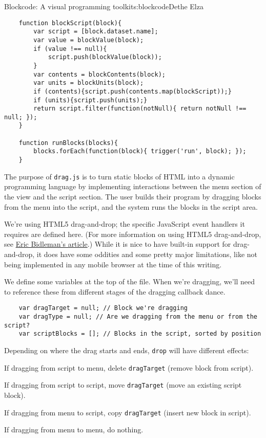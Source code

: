 \begin{aosachapter}{Blockcode: A visual programming toolkit}{s:blockcode}{Dethe Elza}
\begin{verbatim}
    function blockScript(block){
        var script = [block.dataset.name];
        var value = blockValue(block);
        if (value !== null){
            script.push(blockValue(block));
        }
        var contents = blockContents(block);
        var units = blockUnits(block);
        if (contents){script.push(contents.map(blockScript));}
        if (units){script.push(units);}
        return script.filter(function(notNull){ return notNull !== null; });
    }

    function runBlocks(blocks){
        blocks.forEach(function(block){ trigger('run', block); });
    }
\end{verbatim}

\label{drag.js}

The purpose of \texttt{drag.js} is to turn static blocks of HTML into a
dynamic programming language by implementing interactions between the
menu section of the view and the script section. The user builds their
program by dragging blocks from the menu into the script, and the system
runs the blocks in the script area.

We're using HTML5 drag-and-drop; the specific JavaScript event handlers
it requires are defined here. (For more information on using HTML5
drag-and-drop, see
\href{http://www.html5rocks.com/en/tutorials/dnd/basics/}{Eric
Bidleman's article}.) While it is nice to have built-in support for
drag-and-drop, it does have some oddities and some pretty major
limitations, like not being implemented in any mobile browser at the
time of this writing.

We define some variables at the top of the file. When we're dragging,
we'll need to reference these from different stages of the dragging
callback dance.

\begin{verbatim}
    var dragTarget = null; // Block we're dragging
    var dragType = null; // Are we dragging from the menu or from the script?
    var scriptBlocks = []; // Blocks in the script, sorted by position
\end{verbatim}

Depending on where the drag starts and ends, \texttt{drop} will have
different effects:

\begin{aosaitemize}

\item
  If dragging from script to menu, delete \texttt{dragTarget} (remove
  block from script).
\item
  If dragging from script to script, move \texttt{dragTarget} (move an
  existing script block).
\item
  If dragging from menu to script, copy \texttt{dragTarget} (insert new
  block in script).
\item
  If dragging from menu to menu, do nothing.
\end{aosaitemize}


\end{aosachapter}
